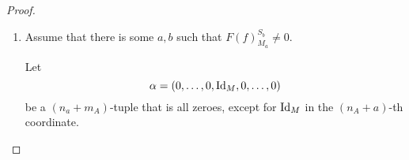 \begin{proof}
\begin{enumerate}
{\begin{enumerate}
{                    That implies that 
                    \( 
                        L_{M, S, S} \neq 0 
                    \)
                    in the 
                    \( 
                        b, a
                    \)
                    -th coordinate.
                    Therefore for
                    \[
                        \alpha = \tuple{ 0, \dots 0, \mu, 0, \dots, 0 }
                    \]
                    a
                    \(
                        (n_a + m_a)
                    \)
                    -tuple that is entirely zero, except for in coordinate
                    \(
                        a
                    \)
                    where it is
                    \(
                        \mu
                    \).

                    Taking
                    \[
                        \phi_B \circ F(f)_* \circ \phi_A^{-1} (\alpha) =
                        \begin{pmatrix}
                            L_{M, S, S} & L_{M, M, S} \\
                            L_{M, S, M} & L_{M, M, M}
                        \end{pmatrix}
                        \tuple{ 0, \dots 0, \mu, 0, \dots, 0 }
                        = \beta
                    \]
                    one gets that the \( b \)-th coordinate of \( \beta \) has the value \( F(f)_{S_a}^{S_b} \circ \mu \).
                    
                    By assumption, \( F(f)_{S_a}^{S_b} \neq 0 \), and therefore by \autoref{lem:S-to-S} \( F(f)_{S_a}^{S_b} = \pm \Id_S \). However, this implies that \( F(f)_{S_a}^{S_b} \circ \mu = \mu \neq 0 \).
                    
                    And so \( \phi_B \circ F(f)_* \circ \phi_A^{-1} \) is non-zero.
                }
                \item {
                    Assume that there is some \( a, b \) such that \( F(f)_{M_a}^{S_b} \neq 0 \).

                    Let
                    \[
                        \alpha = \left( 0, \dots, 0, \operatorname{Id}_M, 0, \dots, 0 \right)
                    \]
                    be a \( ( n_a + m_A ) \)-tuple that is all zeroes, except for \( \operatorname{Id}_M \) in the \( ( n_A + a ) \)-th coordinate.

}
\end{enumerate}}
\end{enumerate}
\end{proof}
